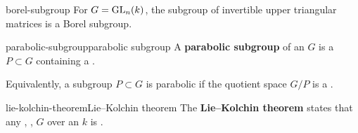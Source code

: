 \begin{example}{borel-subgroup}
    For $G = \textup{GL}_n(k)$, the subgroup of invertible upper triangular matrices is a Borel subgroup.
\end{example}


\begin{topic}{parabolic-subgroup}{parabolic subgroup}
    A \textbf{parabolic subgroup} of an  $G$ is a  $P \subset G$ containing a .
    
    Equivalently, a subgroup $P \subset G$ is parabolic if the quotient space $G/P$ is a .
\end{topic}

\begin{topic}{lie-kolchin-theorem}{Lie--Kolchin theorem}
    The \textbf{Lie--Kolchin theorem} states that any , ,   $G$ over an  $k$ is .
\end{topic}

